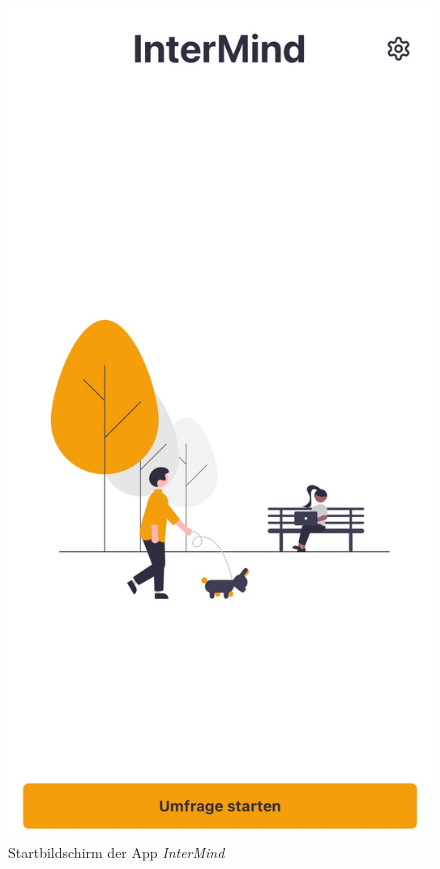 \begin{figure}[h]
    \centering
    \begin{minipage}[t]{0.38\textwidth}
        \centering
        \includegraphics[width=\textwidth]{Arbeit/images/printscreens/startscreen.jpeg}
        \caption{Startbildschirm der App \textit{InterMind}}

\end{minipage}
\end{figure}
